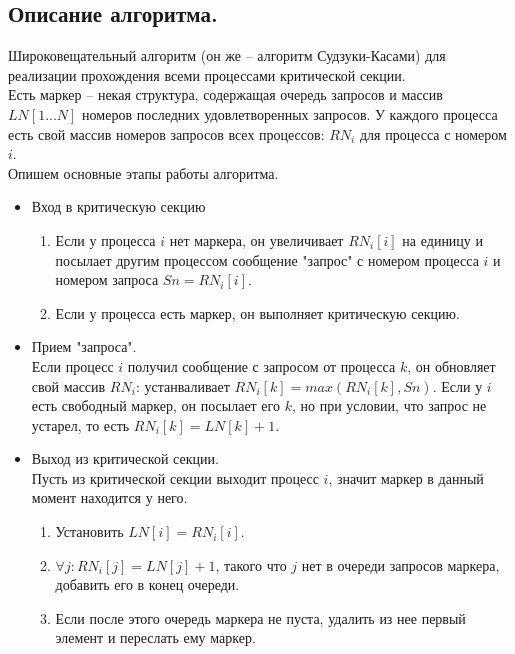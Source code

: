 \documentclass{article}
\begin{document}
\subsection{Описание алгоритма.}
Широковещательный алгоритм (он же -- алгоритм Судзуки-Касами) для реализации прохождения всеми процессами критической секции.\\
Есть маркер -- некая структура, содержащая очередь запросов и массив $LN[1...N]$ номеров последних удовлетворенных запросов. У каждого процесса есть свой массив номеров запросов всех процессов: $RN_i$ для процесса с номером $i$.\\
Опишем основные этапы работы алгоритма.
\begin{itemize}

    \item Вход в критическую секцию
        \begin{enumerate}
            \item Если у процесса $i$ нет маркера, он увеличивает $RN_i[i]$ на единицу и посылает другим процессом сообщение "запрос" с номером процесса $i$ и номером запроса $Sn = RN_i[i]$.
            \item Если у процесса есть маркер, он выполняет критическую секцию.
        \end{enumerate}
        
    \item Прием "запроса".\\
    Если процесс $i$ получил сообщение с запросом от процесса $k$, он обновляет свой массив $RN_i$: устанваливает $RN_i[k] = max(RN_i[k], Sn)$. Если у $i$ есть свободный маркер, он посылает его $k$, но при условии, что запрос не устарел, то есть $RN_i[k] = LN[k] + 1$.
    
    \item Выход из критической секции.\\
    Пусть из критической секции выходит процесс $i$, значит маркер в данный момент находится у него.
        \begin{enumerate}
            \item Установить $LN[i] = RN_i[i]$.
            \item $\forall j: RN_i[j] = LN[j] + 1$, такого что $j$ нет в очереди запросов маркера, добавить его в конец очереди.
            \item Если после этого очередь маркера не пуста, удалить из нее первый элемент и переслать ему маркер.
        \end{enumerate}
\end{itemize}
\end{document}
